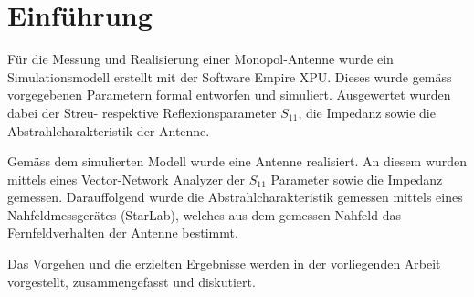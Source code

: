 \section{Einführung}


Für die Messung und Realisierung einer Monopol-Antenne wurde ein
Simulationsmodell erstellt mit der Software
Empire XPU. Dieses wurde gemäss vorgegebenen Parametern formal
entworfen und simuliert. Ausgewertet wurden dabei der
Streu- respektive Reflexionsparameter $S_{11}$, die Impedanz
sowie die Abstrahlcharakteristik der Antenne.

Gemäss dem simulierten Modell wurde eine Antenne realisiert.
An diesem wurden mittels eines Vector-Network Analyzer der
$S_{11}$ Parameter sowie die Impedanz gemessen. Darauffolgend
wurde die Abstrahlcharakteristik gemessen mittels eines
Nahfeldmessgerätes (StarLab), welches aus dem gemessen
Nahfeld das Fernfeldverhalten der Antenne bestimmt.

Das Vorgehen und die erzielten Ergebnisse werden in der
vorliegenden Arbeit vorgestellt, zusammengefasst und
diskutiert.
